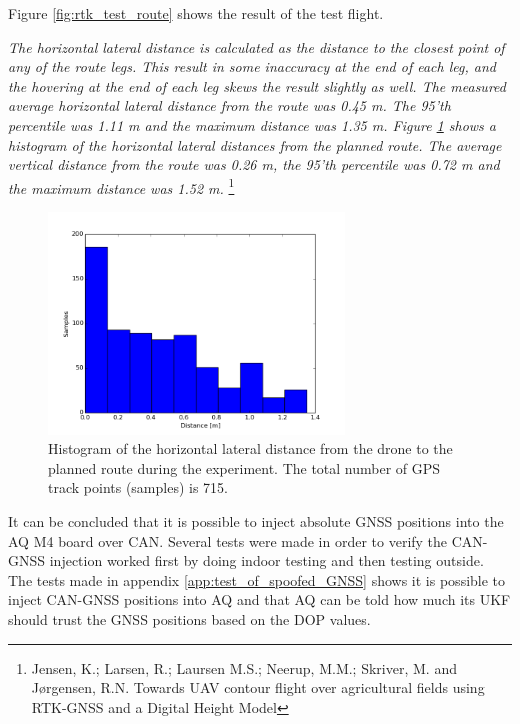 Figure \ref{fig:rtk_test_route} shows the result of the test flight. 



\textit{The horizontal lateral distance is calculated as the distance to the closest point of any of the route legs.
This result in some inaccuracy at the end of each leg, and the hovering at the end of each leg skews the result slightly as well.
The measured average horizontal lateral distance from the route was 0.45 m.
The 95’th percentile was 1.11 m and the maximum distance was 1.35 m.
Figure \ref{fig:rtk_test_hist} shows a histogram of the horizontal lateral distances from the planned route.
The average vertical distance from the route was 0.26 m, the 95’th percentile was 0.72 m and the maximum distance was 1.52 m.} \footnote{Jensen, K.; Larsen, R.; Laursen M.S.; Neerup, M.M.; Skriver, M. and Jørgensen, R.N. Towards UAV contour flight over agricultural fields using RTK-GNSS and a Digital Height Model}

\begin{figure}[H]
    \center
    \includegraphics[width=0.7\textwidth]{graphics/rtk_test_hist_dist.png}
    \caption{Histogram of the horizontal lateral distance from the drone to the planned
route during the experiment. The total number of GPS track points (samples) is 715.}
    \label{fig:rtk_test_hist}
\end{figure}

It can be concluded that it is possible to inject absolute GNSS positions into the \ac{AQ} M4 board over \ac{CAN}.
Several tests were made in order to verify the CAN-GNSS injection worked first by doing indoor testing and then testing outside.
The tests made in appendix \ref{app:test_of_spoofed_GNSS} shows it is possible to inject CAN-GNSS positions into \ac{AQ} and that \ac{AQ} can be told how much its UKF should trust the GNSS positions based on the DOP values.